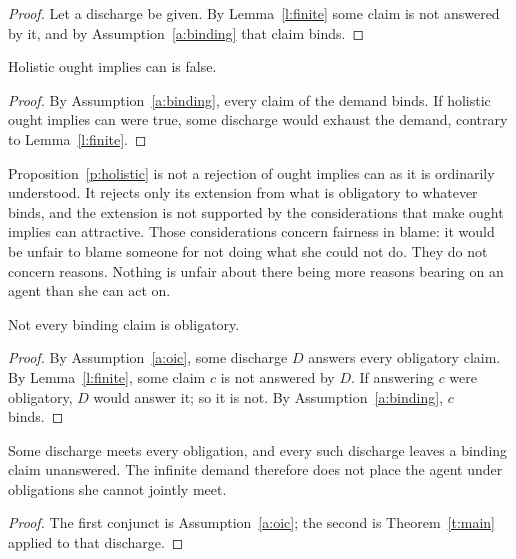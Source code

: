 \documentclass{situationist-preprint}
\begin{document}
\begin{proof}
Let a discharge be given. By Lemma~\ref{l:finite} some claim is not answered by it, and by Assumption~\ref{a:binding} that claim binds.
\end{proof}

\begin{proposition}\label{p:holistic}
Holistic ought implies can is false.
\end{proposition}

\begin{proof}
By Assumption~\ref{a:binding}, every claim of the demand binds. If holistic ought implies can were true, some discharge would exhaust the demand, contrary to Lemma~\ref{l:finite}.
\end{proof}

Proposition~\ref{p:holistic} is not a rejection of ought implies can as it is ordinarily understood. It rejects only its extension from what is obligatory to whatever binds, and the extension is not supported by the considerations that make ought implies can attractive. Those considerations concern fairness in blame: it would be unfair to blame someone for not doing what she could not do. They do not concern reasons. Nothing is unfair about there being more reasons bearing on an agent than she can act on.

\begin{theorem}\label{t:notall}
Not every binding claim is obligatory.
\end{theorem}

\begin{proof}
By Assumption~\ref{a:oic}, some discharge $D$ answers every obligatory claim. By Lemma~\ref{l:finite}, some claim $c$ is not answered by $D$. If answering $c$ were obligatory, $D$ would answer it; so it is not. By Assumption~\ref{a:binding}, $c$ binds.
\end{proof}

\begin{corollary}\label{c:overload}
Some discharge meets every obligation, and every such discharge leaves a binding claim unanswered. The infinite demand therefore does not place the agent under obligations she cannot jointly meet.
\end{corollary}

\begin{proof}
The first conjunct is Assumption~\ref{a:oic}; the second is Theorem~\ref{t:main} applied to that discharge.
\end{proof}
\end{document}
